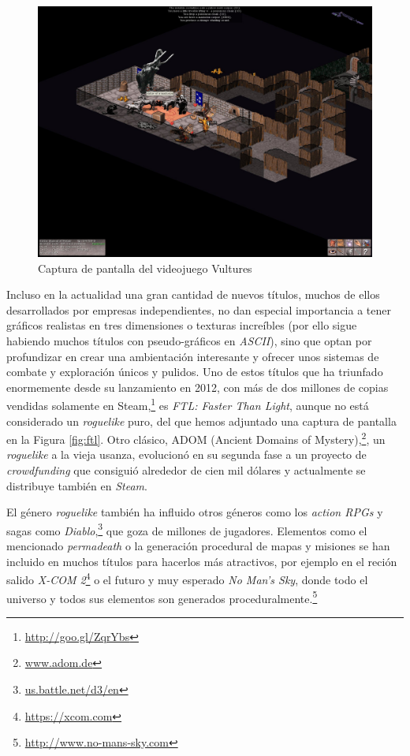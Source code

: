 \begin{figure}[h!]
		\includegraphics[width=\textwidth,height=\textheight,keepaspectratio]{./img/Vultures.jpg}
	\caption{Captura de pantalla del videojuego Vultures}
	\label{fig:vulturesgame}
\end{figure}

Incluso en la actualidad una gran cantidad de nuevos títulos, muchos de ellos desarrollados por empresas independientes, no dan especial importancia a tener gráficos realistas en tres dimensiones o texturas increíbles (por ello sigue habiendo muchos títulos con pseudo-gráficos en \textit{ASCII}), sino que optan por profundizar en crear una ambientación interesante y ofrecer unos sistemas de combate y exploración únicos y pulidos.
Uno de estos títulos que ha triunfado enormemente desde su lanzamiento en 2012, con más de dos millones de copias vendidas solamente en Steam,\footnote{\url{http://goo.gl/ZqrYbs}} es \textit{FTL: Faster Than Light}, aunque no está considerado un \textit{roguelike} puro, del que hemos adjuntado una captura de pantalla en la Figura \ref{fig:ftl}. Otro clásico, ADOM (Ancient Domains of Mystery),\footnote{\url{www.adom.de}}, un \textit{roguelike} a la vieja usanza, evolucionó en su segunda fase a un proyecto de \textit{crowdfunding} que consiguió alrededor de cien mil dólares y actualmente se distribuye también en \textit{Steam}.

El género \textit{roguelike} también ha influido otros géneros como los \textit{action RPGs} y sagas como \textit{Diablo},\footnote{\url{us.battle.net/d3/en}} que goza de millones de jugadores.
Elementos como el mencionado \textit{permadeath} o la generación procedural de mapas y misiones se han incluido en muchos títulos para hacerlos más atractivos, por ejemplo en el reción salido \textit{X-COM 2}\footnote{\url{https://xcom.com}} o el futuro y muy esperado \textit{No Man's Sky}, donde todo el universo y todos sus elementos son generados proceduralmente.\footnote{\url{http://www.no-mans-sky.com}}

